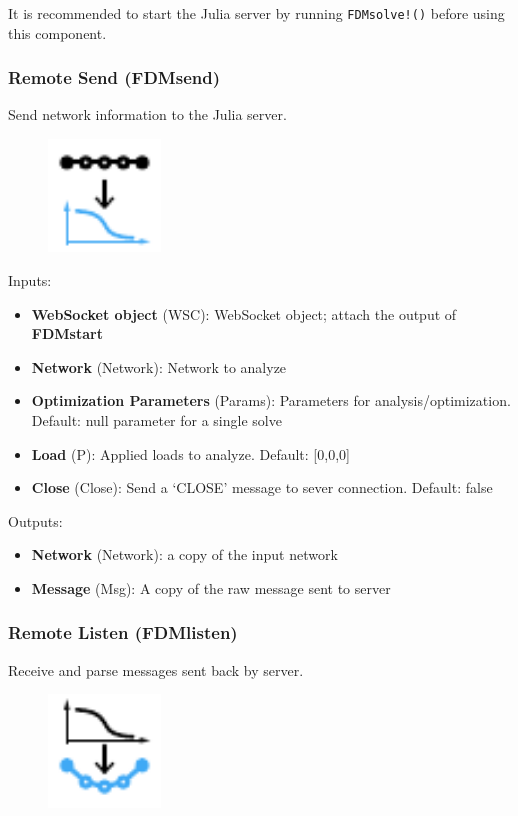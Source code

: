 It is recommended to start the Julia server by running \texttt{FDMsolve!()} before using this component.
\subsubsection{Remote Send (FDMsend)} \label{FDMsend}
Send network information to the Julia server.

\begin{figure}[h]
    \centering
    \includegraphics[width=3cm]{Figures/send}
\end{figure}

Inputs:
\begin{itemize}
    \setlength\itemsep{0.05em}
    \item \textbf{WebSocket object} (WSC): WebSocket object; attach the output of \textbf{FDMstart}
    \item \textbf{Network} (Network): Network to analyze
    \item \textbf{Optimization Parameters} (Params): Parameters for analysis/optimization. {\color{gray} Default: null parameter for a single solve}
    \item \textbf{Load} (P): Applied loads to analyze. {\color{gray} Default: [0,0,0]}
    \item \textbf{Close} (Close): Send a `CLOSE' message to sever connection. {\color{gray} Default: false}  
\end{itemize}

Outputs:
\begin{itemize}
    \setlength\itemsep{0.05em}
    \item \textbf{Network} (Network): a copy of the input network
    \item \textbf{Message} (Msg): A copy of the raw message sent to server
\end{itemize}

\subsubsection{Remote Listen (FDMlisten)} \label{FDMlisten}
Receive and parse messages sent back by server.

\begin{figure}[h]
    \centering
    \includegraphics[width=3cm]{Figures/listen}
\end{figure}

